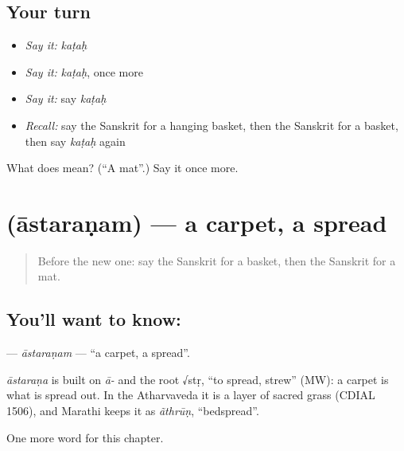 \subsection*{Your turn}
\begin{itemize}
\raggedright
  \item \emph{Say it:} \emph{kaṭaḥ}
  \item \emph{Say it:} \emph{kaṭaḥ}, once more
  \item \emph{Say it:} say \emph{kaṭaḥ}
  \item \emph{Recall:} say the Sanskrit for a hanging basket, then the Sanskrit for a basket, then say \emph{kaṭaḥ} again
\end{itemize}

\begin{tcolorbox}[breakable,colback=teal!4,colframe=teal!35!black,title={Before you move on}]
What does  mean? (\textquotedblleft{}A mat\textquotedblright{}.) Say it once more.
\end{tcolorbox}
\section[\texorpdfstring{\sk{आस्तरणम्} (āstaraṇam)}{आस्तरणम् (āstaraṇam)}]{ (āstaraṇam) — a carpet, a spread}

\label{lesson:SA-C189-astaranam}



\begin{quote}
Before the new one: say the Sanskrit for a basket, then the Sanskrit for a mat.
\end{quote}

\subsection*{You'll want to know: }
\textbf{} — \emph{āstaraṇam} — \textquotedblleft{}a carpet, a spread\textquotedblright{}.

\begin{cousinweb}
\emph{āstaraṇa} is built on \emph{ā-} and the root √stṛ, \textquotedblleft{}to spread, strew\textquotedblright{} (MW): a carpet is what is spread out. In the Atharvaveda it is a layer of sacred grass (CDIAL 1506), and Marathi keeps it as \emph{ãthrūṇ}, \textquotedblleft{}bedspread\textquotedblright{}.
\end{cousinweb}

\begin{grammarlens}[title={What you've built}]
One more word for this chapter.
\end{grammarlens}

